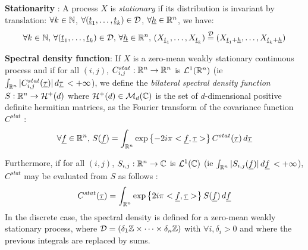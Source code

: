 {\bf Stationarity }: A process $X$ is \emph{stationary} if its distribution is invariant by translation: $\forall k \in {\mathbb N}$, $\forall ({\underline{t}}_1, \dots, {\underline{t}}_k) \in {\mathcal D}$, $\forall {\underline{h}}\in {\mathbb R}^n$, we have:
\begin{equation} \label{statGen}
  \forall k \in {\mathbb N}, \, \forall ({\underline{t}}_1, \dots, {\underline{t}}_k) \in {\mathcal D}, \, \forall {\underline{h}}\in {\mathbb R}^n, \, (X_{{\underline{t}}_1}, \dots, X_{{\underline{t}}_k}) \stackrel{\mathcal{D}}{=} (X_{{\underline{t}}_1+{\underline{h}}}, \dots, X_{{\underline{t}}_k+{\underline{h}}})
\end{equation}



{\bf Spectral density function}:  If $X$  is a zero-mean weakly stationary continuous process and if for all $(i,j)$, $C^{stat}_{i,j} : {\mathbb R}^n \rightarrow {\mathbb R}^n$ is ${\mathcal L}^1({\mathbb R}^n)$ (ie $\int_{{\mathbb R}^n} |C^{stat}_{i,j}({\underline{\tau}})|\, d{\underline{\tau}}\, < +\infty$),  we  define the \emph{ bilateral spectral density function} $S : {\mathbb R}^n \rightarrow {\mathcal H}^+(d)$ where $\mathcal{H}^+(d) \in \mathcal{M}_d({\mathbb C})$ is the set of $d$-dimensional positive definite hermitian matrices, as the Fourier transform of the covariance function $C^{stat}$ :
\begin{equation} \label{specdensFunc}
  \forall {\underline{f}} \in {\mathbb R}^n, \,S({\underline{f}}) = \int_{{\mathbb R}^n}\exp\left\{  -2i\pi <{\underline{f}},{\underline{\tau}}> \right\} C^{stat}({\underline{\tau}})\, d{\underline{\tau}}
\end{equation}

Furthermore, if for all $(i,j)$, $S_{i,j}: {\mathbb R}^n \rightarrow {\mathbb C}$ is ${\mathcal L}^1({\mathbb C})$ (ie $\int_{{\mathbb R}^n} |S_{i,j}({\underline{f}})|\, d{\underline{f}}\, < +\infty$), $C^{stat}$ may be evaluated from $S$ as follows :
\begin{equation} \label{cspectransform}
  C^{stat}({\underline{\tau}})  = \int_{{\mathbb R}^n}\exp\left\{  2i\pi <{\underline{f}}, {\underline{\tau}}> \right\}S({\underline{f}})\, d{\underline{f}}
\end{equation}
In the discrete case, the spectral density is defined for a zero-mean weakly stationary process, where ${\mathcal D}=(\delta_1 {\mathbb Z} \times \dots \times \delta_n {\mathbb Z})$ with $\forall i, \delta_i >0$ and where the previous integrals are replaced by sums.
